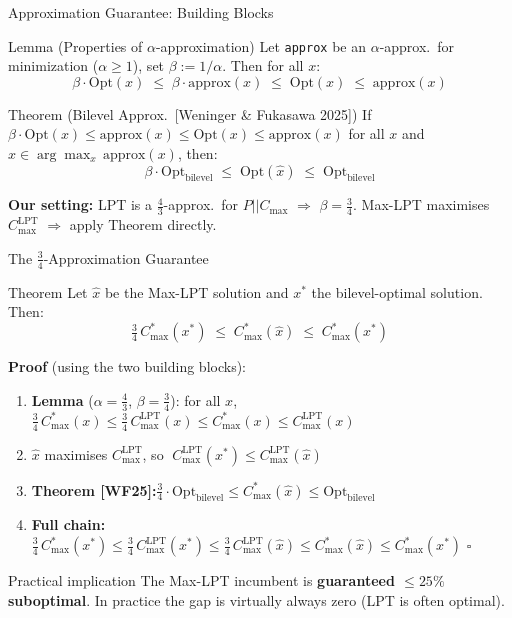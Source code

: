 \documentclass[fleqn,11pt,aspectratio=43]{beamer}
\newcommand{\Cmax}{C_{\max}}
\newcommand{\Copt}{C_{\max}^{*}}
\newcommand{\Clpt}{C_{\max}^{\mathrm{LPT}}}
\begin{document}
\begin{frame}[shrink=5]{Approximation Guarantee: Building Blocks}
  \begin{block}{Lemma (Properties of $\alpha$-approximation)}
    \vspace{-0.2em}
    \small Let \texttt{approx} be an $\alpha$-approx.\ for minimization ($\alpha\geq 1$), set $\beta:=1/\alpha$. Then for all $x$:
    \[\beta\cdot\mathrm{Opt}(x)\;\leq\;\beta\cdot\mathrm{approx}(x)\;\leq\;\mathrm{Opt}(x)\;\leq\;\mathrm{approx}(x)\]
    \vspace{-0.3em}
  \end{block}
  \begin{block}{Theorem (Bilevel Approx.\ [Weninger \& Fukasawa 2025])}
    \vspace{-0.2em}
    \small If $\beta\cdot\mathrm{Opt}(x)\leq\mathrm{approx}(x)\leq\mathrm{Opt}(x)\leq\mathrm{approx}(x)$ for all $x$ and $\hat x\in\arg\max_x\,\mathrm{approx}(x)$, then:
    \[\beta\cdot\mathrm{Opt}_{\text{bilevel}}\;\leq\;\mathrm{Opt}(\hat x)\;\leq\;\mathrm{Opt}_{\text{bilevel}}\]
    \vspace{-0.3em}
  \end{block}
  \textbf{Our setting:} LPT is a $\tfrac{4}{3}$-approx.\ for $P||\Cmax$ $\Rightarrow$ $\beta=\tfrac{3}{4}$. Max-LPT maximises $\Clpt$ $\Rightarrow$ apply Theorem directly.
\end{frame}

\begin{frame}[shrink=5]{The $\frac{3}{4}$-Approximation Guarantee}
  \begin{block}{Theorem}
    Let $\hat x$ be the Max-LPT solution and $x^*$ the bilevel-optimal solution. Then:
    \[\tfrac{3}{4}\,\Copt(x^*)\;\leq\;\Copt(\hat x)\;\leq\;\Copt(x^*)\]
  \end{block}
  \textbf{Proof} (using the two building blocks):
  \begin{enumerate}\small
    \item \textbf{Lemma} ($\alpha=\tfrac{4}{3}$, $\beta=\tfrac{3}{4}$): for all $x$,\quad $\tfrac34\,\Copt(x)\leq\tfrac34\,\Clpt(x)\leq\Copt(x)\leq\Clpt(x)$
    \item $\hat x$ maximises $\Clpt$, so $\;\Clpt(x^*)\leq\Clpt(\hat x)$
    \item \textbf{Theorem [WF25]:}\quad $\tfrac{3}{4}\cdot\mathrm{Opt}_{\text{bilevel}}\leq\Copt(\hat x)\leq\mathrm{Opt}_{\text{bilevel}}$
    \item \textbf{Full chain:}\quad $\tfrac34\,\Copt(x^*)\leq\tfrac34\,\Clpt(x^*)\leq\tfrac34\,\Clpt(\hat x)\leq\Copt(\hat x)\leq\Copt(x^*)$ \hfill$\square$
  \end{enumerate}
  \begin{alertblock}{Practical implication}
    The Max-LPT incumbent is \textbf{guaranteed $\leq 25\%$ suboptimal}.
    In practice the gap is virtually always zero (LPT is often optimal).
  \end{alertblock}
\end{frame}
\end{document}
